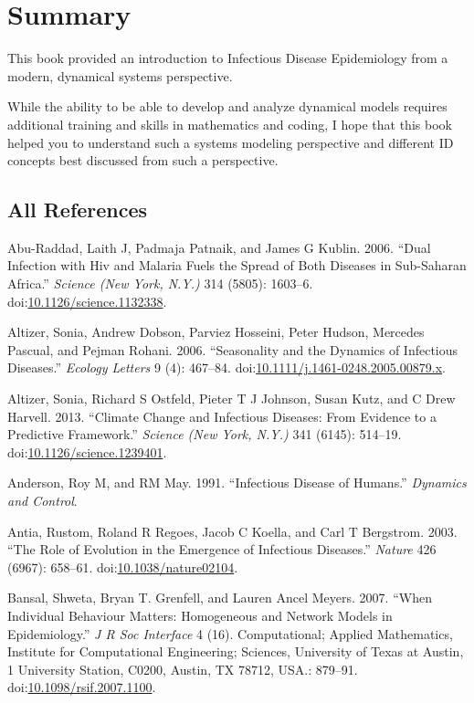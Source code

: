 \documentclass[]{book}
\theoremstyle{definition}
\theoremstyle{definition}
\theoremstyle{definition}
\theoremstyle{remark}
\begin{document}
\chapter{Summary}\label{summary}

This book provided an introduction to Infectious Disease Epidemiology
from a modern, dynamical systems perspective.

While the ability to be able to develop and analyze dynamical models
requires additional training and skills in mathematics and coding, I
hope that this book helped you to understand such a systems modeling
perspective and different ID concepts best discussed from such a
perspective.

\section{All References}\label{all-references}

\hypertarget{refs}{}
\hypertarget{ref-abu-raddad06}{}
Abu-Raddad, Laith J, Padmaja Patnaik, and James G Kublin. 2006. ``Dual
Infection with Hiv and Malaria Fuels the Spread of Both Diseases in
Sub-Saharan Africa.'' \emph{Science (New York, N.Y.)} 314 (5805):
1603--6.
doi:\href{https://doi.org/10.1126/science.1132338}{10.1126/science.1132338}.

\hypertarget{ref-altizer06}{}
Altizer, Sonia, Andrew Dobson, Parviez Hosseini, Peter Hudson, Mercedes
Pascual, and Pejman Rohani. 2006. ``Seasonality and the Dynamics of
Infectious Diseases.'' \emph{Ecology Letters} 9 (4): 467--84.
doi:\href{https://doi.org/10.1111/j.1461-0248.2005.00879.x}{10.1111/j.1461-0248.2005.00879.x}.

\hypertarget{ref-altizer13}{}
Altizer, Sonia, Richard S Ostfeld, Pieter T J Johnson, Susan Kutz, and C
Drew Harvell. 2013. ``Climate Change and Infectious Diseases: From
Evidence to a Predictive Framework.'' \emph{Science (New York, N.Y.)}
341 (6145): 514--19.
doi:\href{https://doi.org/10.1126/science.1239401}{10.1126/science.1239401}.

\hypertarget{ref-anderson91}{}
Anderson, Roy M, and RM May. 1991. ``Infectious Disease of Humans.''
\emph{Dynamics and Control}.

\hypertarget{ref-antia03}{}
Antia, Rustom, Roland R Regoes, Jacob C Koella, and Carl T Bergstrom.
2003. ``The Role of Evolution in the Emergence of Infectious Diseases.''
\emph{Nature} 426 (6967): 658--61.
doi:\href{https://doi.org/10.1038/nature02104}{10.1038/nature02104}.

\hypertarget{ref-bansal07}{}
Bansal, Shweta, Bryan T. Grenfell, and Lauren Ancel Meyers. 2007. ``When
Individual Behaviour Matters: Homogeneous and Network Models in
Epidemiology.'' \emph{J R Soc Interface} 4 (16). Computational; Applied
Mathematics, Institute for Computational Engineering; Sciences,
University of Texas at Austin, 1 University Station, C0200, Austin, TX
78712, USA.: 879--91.
doi:\href{https://doi.org/10.1098/rsif.2007.1100}{10.1098/rsif.2007.1100}.
\end{document}

